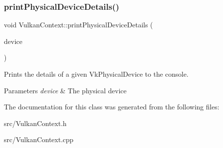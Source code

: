 \subsubsection{\texorpdfstring{printPhysicalDeviceDetails()}{printPhysicalDeviceDetails()}}
{\footnotesize\ttfamily void Vulkan\+Context\+::print\+Physical\+Device\+Details (\begin{DoxyParamCaption}\item[{Vk\+Physical\+Device}]{device }\end{DoxyParamCaption})\hspace{0.3cm}{\ttfamily [private]}}



Prints the details of a given Vk\+Physical\+Device to the console. 


\begin{DoxyParams}{Parameters}
{\em device} & The physical device \\
\hline
\end{DoxyParams}


The documentation for this class was generated from the following files\+:\begin{DoxyCompactItemize}
\item 
src/Vulkan\+Context.\+h\item 
src/Vulkan\+Context.\+cpp\end{DoxyCompactItemize}

